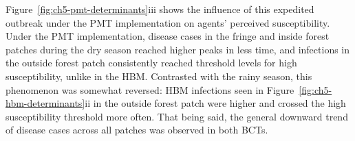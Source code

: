 

Figure~\ref{fig:ch5-pmt-determinants}iii shows the influence of this expedited outbreak under the PMT implementation on agents' perceived susceptibility. Under the PMT implementation, disease cases in the fringe and inside forest patches during the dry season reached higher peaks in less time, and infections in the outside forest patch consistently reached threshold levels for high susceptibility, unlike in the HBM. Contrasted with the rainy season, this phenomenon was somewhat reversed: HBM infections seen in Figure~\ref{fig:ch5-hbm-determinants}ii in the outside forest patch were higher and crossed the high susceptibility threshold more often. That being said, the general downward trend of disease cases across all patches was observed in both BCTs.

